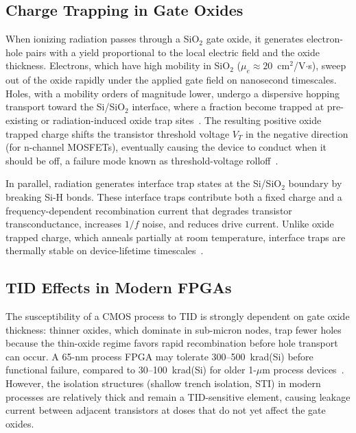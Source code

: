 \subsection{Charge Trapping in Gate Oxides}

When ionizing radiation passes through a SiO$_2$ gate oxide, it
generates electron-hole pairs with a yield proportional to the local
electric field and the oxide thickness.  Electrons, which have high
mobility in SiO$_2$ ($\mu_e \approx 20$~cm$^2$/V$\cdot$s), sweep
out of the oxide rapidly under the applied gate field on nanosecond
timescales.  Holes, with a mobility orders of magnitude lower,
undergo a dispersive hopping transport toward the Si/SiO$_2$
interface, where a fraction become trapped at pre-existing or
radiation-induced oxide trap sites~\cite{oldham2003total}.  The
resulting positive oxide trapped charge shifts the transistor
threshold voltage $V_T$ in the negative direction (for n-channel
MOSFETs), eventually causing the device to conduct when it should
be off, a failure mode known as threshold-voltage
rolloff~\cite{fleetwood2013total}.

In parallel, radiation generates interface trap states at the
Si/SiO$_2$ boundary by breaking Si-H bonds.  These interface traps
contribute both a fixed charge and a frequency-dependent
recombination current that degrades transistor transconductance,
increases $1/f$ noise, and reduces drive current.  Unlike oxide
trapped charge, which anneals partially at room temperature,
interface traps are thermally stable on device-lifetime
timescales~\cite{oldham2003total}.

\subsection{TID Effects in Modern FPGAs}

The susceptibility of a CMOS process to TID is strongly dependent
on gate oxide thickness: thinner oxides, which dominate in
sub-micron nodes, trap fewer holes because the thin-oxide regime
favors rapid recombination before hole transport can occur.
A 65-nm process FPGA may tolerate 300--500~krad(Si) before
functional failure, compared to 30--100~krad(Si) for older
1-$\mu$m process devices~\cite{schwank2013radiation}.  However,
the isolation structures (shallow trench isolation, STI) in modern
processes are relatively thick and remain a TID-sensitive element,
causing leakage current between adjacent transistors at doses that
do not yet affect the gate oxides.

